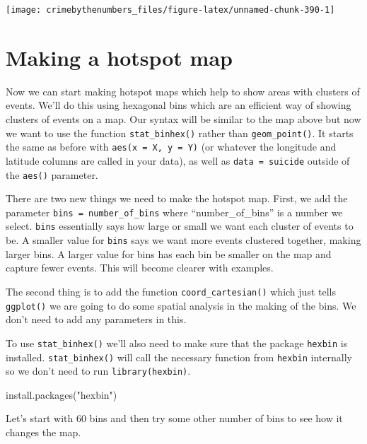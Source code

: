 \documentclass[
]{krantz}
\makeatletter
\newenvironment{Shaded}{\begin{snugshade}}{\end{snugshade}}
\newcommand{\FunctionTok}[1]{\textcolor[rgb]{0,0,0}{#1}}
\newcommand{\NormalTok}[1]{#1}
\newcommand{\StringTok}[1]{\textcolor[rgb]{0.5,0.5,0.5}{#1}}
\newenvironment{kframe}{%
\medskip{}
\setlength{\fboxsep}{.8em}
 \def\at@end@of@kframe{}%
 \ifinner\ifhmode%
  \def\at@end@of@kframe{\end{minipage}}%
  \begin{minipage}{\columnwidth}%
 \fi\fi%
 \def\FrameCommand##1{\hskip\@totalleftmargin \hskip-\fboxsep
 \colorbox{shadecolor}{##1}\hskip-\fboxsep
     \hskip-\linewidth \hskip-\@totalleftmargin \hskip\columnwidth}%
 \MakeFramed {\advance\hsize-\width
   \@totalleftmargin\z@ \linewidth\hsize
   \@setminipage}}%
 {\par\unskip\endMakeFramed%
 \at@end@of@kframe}
\renewenvironment{Shaded}{\begin{kframe}}{\end{kframe}}
\makeatother
\begin{document}
\begin{center}\texttt{[image: crimebythenumbers\_files/figure-latex/unnamed-chunk-390-1]} \end{center}

\hypertarget{making-a-hotspot-map}{%
\section{Making a hotspot map}\label{making-a-hotspot-map}}

Now we can start making hotspot maps which help to show areas with clusters of events. We'll do this using hexagonal bins which are an efficient way of showing clusters of events on a map. Our syntax will be similar to the map above but now we want to use the function \texttt{stat\_binhex()} rather than \texttt{geom\_point()}. It starts the same as before with \texttt{aes(x\ =\ X,\ y\ =\ Y)} (or whatever the longitude and latitude columns are called in your data), as well as \texttt{data\ =\ suicide} outside of the \texttt{aes()} parameter.

There are two new things we need to make the hotspot map. First, we add the parameter \texttt{bins\ =\ number\_of\_bins} where ``number\_of\_bins'' is a number we select. \texttt{bins} essentially says how large or small we want each cluster of events to be. A smaller value for \texttt{bins} says we want more events clustered together, making larger bins. A larger value for bins has each bin be smaller on the map and capture fewer events. This will become clearer with examples.

The second thing is to add the function \texttt{coord\_cartesian()} which just tells \texttt{ggplot()} we are going to do some spatial analysis in the making of the bins. We don't need to add any parameters in this.

To use \texttt{stat\_binhex()} we'll also need to make sure that the package \texttt{hexbin} is installed. \texttt{stat\_binhex()} will call the necessary function from \texttt{hexbin} internally so we don't need to run \texttt{library(hexbin)}.

\begin{Shaded}
\begin{Highlighting}[]
\FunctionTok{install.packages}\NormalTok{(}\StringTok{"hexbin"}\NormalTok{)}
\end{Highlighting}
\end{Shaded}

Let's start with 60 bins and then try some other number of bins to see how it changes the map.
\end{document}

